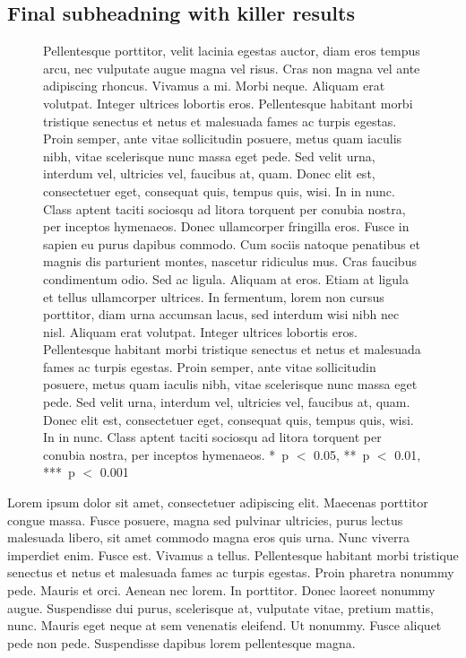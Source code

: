 \documentclass{biorxiv}
\begin{document}
\subsection{Final subheadning with killer results}
\begin{figure}[t]
  \figureplaceholder{\twocolumnwidth}{71.05mm}%
  \caption{
     Pellentesque porttitor, velit lacinia egestas auctor, diam
    eros tempus arcu, nec vulputate augue magna vel risus. Cras non magna
    vel ante adipiscing rhoncus. Vivamus a mi. Morbi neque. Aliquam erat
    volutpat. Integer ultrices lobortis eros. Pellentesque habitant morbi
    tristique senectus et netus et malesuada fames ac turpis egestas.
     Proin semper, ante vitae sollicitudin posuere, metus quam
    iaculis nibh, vitae scelerisque nunc massa eget pede. Sed velit urna,
    interdum vel, ultricies vel, faucibus at, quam. Donec elit est,
    consectetuer eget, consequat quis, tempus quis, wisi. In in nunc. Class
    aptent taciti sociosqu ad litora torquent per conubia nostra, per
    inceptos hymenaeos. Donec ullamcorper fringilla eros. Fusce in sapien eu
    purus dapibus commodo. Cum sociis natoque penatibus et magnis dis
    parturient montes, nascetur ridiculus mus. Cras faucibus condimentum
    odio.  Sed ac ligula. Aliquam at eros. Etiam at ligula et
    tellus ullamcorper ultrices. In fermentum, lorem non cursus porttitor,
    diam urna accumsan lacus, sed interdum wisi nibh nec nisl. 
    Aliquam erat volutpat. Integer ultrices lobortis eros. Pellentesque
    habitant morbi tristique senectus et netus et malesuada fames ac turpis
    egestas. Proin semper, ante vitae sollicitudin posuere, metus quam
    iaculis nibh, vitae scelerisque nunc massa eget pede. Sed velit urna,
    interdum vel, ultricies vel, faucibus at, quam. Donec elit est,
    consectetuer eget, consequat quis, tempus quis, wisi. In in nunc. Class
    aptent taciti sociosqu ad litora torquent per conubia nostra, per
    inceptos hymenaeos. *~p $<$ 0.05, **~p $<$ 0.01, ***~p
    $<$ 0.001}
  \label{fig:double}
\end{figure}

Lorem ipsum dolor sit amet, consectetuer adipiscing elit. Maecenas porttitor
congue massa. Fusce posuere, magna sed pulvinar ultricies, purus lectus
malesuada libero, sit amet commodo magna eros quis urna. Nunc viverra
imperdiet enim. Fusce est. Vivamus a tellus. Pellentesque habitant morbi
tristique senectus et netus et malesuada fames ac turpis egestas. Proin
pharetra nonummy pede. Mauris et orci. Aenean nec lorem. In porttitor. Donec
laoreet nonummy augue. Suspendisse dui purus, scelerisque at, vulputate vitae,
pretium mattis, nunc. Mauris eget neque at sem venenatis eleifend. Ut nonummy.
Fusce aliquet pede non pede. Suspendisse dapibus lorem pellentesque magna.
\end{document}

